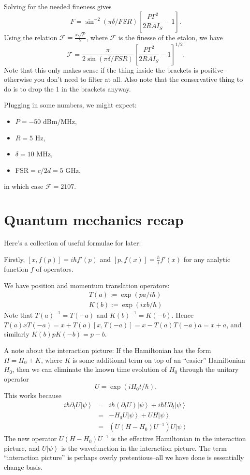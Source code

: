 \documentclass[aps,twocolumn,prb,floatfix,amsmath,amssymb,groupedaddress]{revtex4}
\begin{document}
Solving for the needed fineness gives \[F = \sin^{-2}\left(\pi\delta/FSR\right) \left[\frac{P\Gamma^2}{2RAI_S}-1\right].\]
Using the relation $\mathcal{F} = \frac{\pi \sqrt{F}}{2}$, where $\mathcal{F}$ is the finesse of the etalon, we have \[\mathcal{F} = \frac{\pi}{2\sin\left(\pi\delta/FSR\right)} \left[\frac{P\Gamma^2}{2RAI_S}-1\right]^{1/2}.\]
Note that this only makes sense if the thing inside the brackets is positive--otherwise you don't need to filter at all.  Also note that the conservative thing to do is to drop the 1 in the brackets anyway. 

Plugging in some numbers, we might expect: 
\begin{itemize}
\item $P=-50$ dBm/MHz, 
\item $R=5$ Hz,
\item $\delta=10$ MHz,
\item FSR$=c/2d=5$ GHz,
\end{itemize}
in which case $\mathcal{F} = 2107$.

\newpage

\section{Quantum mechanics recap}
Here's a collection of useful formulae for later:

Firstly, $[x,f(p)] = i\hbar f'(p)$ and $[p,f(x)] = \frac{\hbar}{i} f'(x)$ for any analytic function $f$ of operators.

We have position and momentum translation operators:
\begin{eqnarray*}
T(a):=\exp(pa/i\hbar) \\
K(b):=\exp(ixb/\hbar)
\end{eqnarray*}
Note that $T(a)^{-1} = T(-a)$ and $K(b)^{-1} = K(-b)$.  Hence $T(a)x T(-a) = x + T(a)[x,T(-a)] = x - T(a)T(-a)a = x+a$, and similarly $K(b)p K(-b) = p - b$.

A note about the interaction picture:  If the Hamiltonian has the form $H = H_0 + K$, where $K$ is some additional term on top of an ``easier'' Hamiltonian $H_0$, then we can eliminate the known time evolution of $H_0$ through the unitary operator \[U=\exp(iH_0t/\hbar).\]
This works because
\begin{eqnarray*}
i\hbar \partial_t U \left|\psi\right> & = & i\hbar (\partial_t U) \left|\psi\right> + i\hbar U \partial_t \left|\psi\right> \\
 & = & - H_0 U \left|\psi\right> + U H \left|\psi\right> \\
& = & \left( U \left(H-H_0\right) U^{-1} \right) U \left|\psi\right>
\end{eqnarray*}
The new operator $U(H-H_0)U^{-1}$ is the effective Hamiltonian in the interaction picture, and $U\left|\psi\right>$ is the wavefunction in the interaction picture.  The term ``interaction picture'' is perhaps overly pretentious--all we have done is essentially change basis. 
\end{document}
